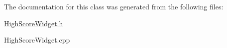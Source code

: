 \-The documentation for this class was generated from the following files\-:\begin{DoxyCompactItemize}
\item 
\hyperlink{_high_score_widget_8h}{\-High\-Score\-Widget.\-h}\item 
\-High\-Score\-Widget.\-cpp\end{DoxyCompactItemize}
